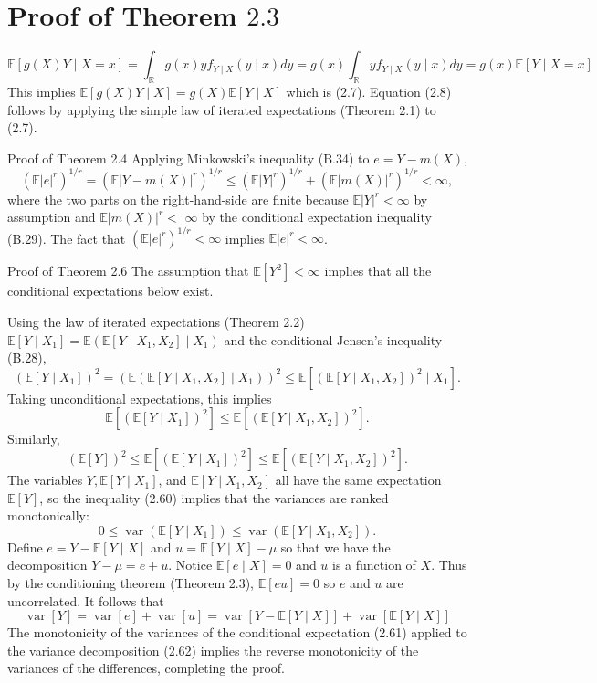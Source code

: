 \documentclass[10pt]{article}
\begin{document}
\section{Proof of Theorem $2.3$}
$$
\mathbb{E}[g(X) Y \mid X=x]=\int_{\mathbb{R}} g(x) y f_{Y \mid X}(y \mid x) d y=g(x) \int_{\mathbb{R}} y f_{Y \mid X}(y \mid x) d y=g(x) \mathbb{E}[Y \mid X=x]
$$
This implies $\mathbb{E}[g(X) Y \mid X]=g(X) \mathbb{E}[Y \mid X]$ which is (2.7). Equation (2.8) follows by applying the simple law of iterated expectations (Theorem 2.1) to (2.7).

Proof of Theorem 2.4 Applying Minkowski's inequality (B.34) to $e=Y-m(X)$,
$$
\left(\mathbb{E}|e|^{r}\right)^{1 / r}=\left(\mathbb{E}|Y-m(X)|^{r}\right)^{1 / r} \leq\left(\mathbb{E}|Y|^{r}\right)^{1 / r}+\left(\mathbb{E}|m(X)|^{r}\right)^{1 / r}<\infty,
$$
where the two parts on the right-hand-side are finite because $\mathbb{E}|Y|^{r}<\infty$ by assumption and $\mathbb{E}|m(X)|^{r}<$ $\infty$ by the conditional expectation inequality (B.29). The fact that $\left(\mathbb{E}|e|^{r}\right)^{1 / r}<\infty$ implies $\mathbb{E}|e|^{r}<\infty$.

Proof of Theorem 2.6 The assumption that $\mathbb{E}\left[Y^{2}\right]<\infty$ implies that all the conditional expectations below exist.

Using the law of iterated expectations (Theorem 2.2) $\mathbb{E}\left[Y \mid X_{1}\right]=\mathbb{E}\left(\mathbb{E}\left[Y \mid X_{1}, X_{2}\right] \mid X_{1}\right)$ and the conditional Jensen's inequality (B.28),
$$
\left(\mathbb{E}\left[Y \mid X_{1}\right]\right)^{2}=\left(\mathbb{E}\left(\mathbb{E}\left[Y \mid X_{1}, X_{2}\right] \mid X_{1}\right)\right)^{2} \leq \mathbb{E}\left[\left(\mathbb{E}\left[Y \mid X_{1}, X_{2}\right]\right)^{2} \mid X_{1}\right] .
$$
Taking unconditional expectations, this implies
$$
\mathbb{E}\left[\left(\mathbb{E}\left[Y \mid X_{1}\right]\right)^{2}\right] \leq \mathbb{E}\left[\left(\mathbb{E}\left[Y \mid X_{1}, X_{2}\right]\right)^{2}\right] .
$$
Similarly,
$$
(\mathbb{E}[Y])^{2} \leq \mathbb{E}\left[\left(\mathbb{E}\left[Y \mid X_{1}\right]\right)^{2}\right] \leq \mathbb{E}\left[\left(\mathbb{E}\left[Y \mid X_{1}, X_{2}\right]\right)^{2}\right] .
$$
The variables $Y, \mathbb{E}\left[Y \mid X_{1}\right]$, and $\mathbb{E}\left[Y \mid X_{1}, X_{2}\right]$ all have the same expectation $\mathbb{E}[Y]$, so the inequality (2.60) implies that the variances are ranked monotonically:
$$
0 \leq \operatorname{var}\left(\mathbb{E}\left[Y \mid X_{1}\right]\right) \leq \operatorname{var}\left(\mathbb{E}\left[Y \mid X_{1}, X_{2}\right]\right) .
$$
Define $e=Y-\mathbb{E}[Y \mid X]$ and $u=\mathbb{E}[Y \mid X]-\mu$ so that we have the decomposition $Y-\mu=e+u$. Notice $\mathbb{E}[e \mid X]=0$ and $u$ is a function of $X$. Thus by the conditioning theorem (Theorem 2.3), $\mathbb{E}[e u]=0$ so $e$ and $u$ are uncorrelated. It follows that
$$
\operatorname{var}[Y]=\operatorname{var}[e]+\operatorname{var}[u]=\operatorname{var}[Y-\mathbb{E}[Y \mid X]]+\operatorname{var}[\mathbb{E}[Y \mid X]]
$$
The monotonicity of the variances of the conditional expectation (2.61) applied to the variance decomposition (2.62) implies the reverse monotonicity of the variances of the differences, completing the proof.
\end{document}
